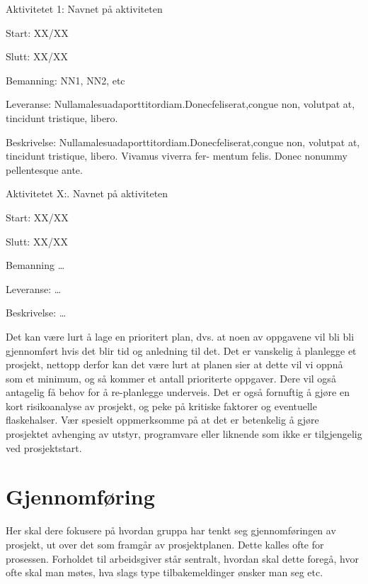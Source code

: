 \documentclass[11pt,a4paper]{report}
\begin{document}
\begin{compactdesc}
\item [Aktivitetet 1:] Navnet på aktiviteten
	\begin{compactitem}
	\item Start: XX/XX
	\item Slutt: XX/XX
	\item Bemanning: NN1, NN2, etc
	\item Leveranse: Nullamalesuadaporttitordiam.Donecfeliserat,congue
non, volutpat at, tincidunt tristique, libero. 
	\item Beskrivelse: Nullamalesuadaporttitordiam.Donecfeliserat,congue
non, volutpat at, tincidunt tristique, libero. Vivamus viverra fer- mentum felis. Donec nonummy pellentesque ante. 
	\end{compactitem}
	\item [Aktivitetet X:.] Navnet på aktiviteten
	\begin{compactitem}
	\item Start: XX/XX
	\item Slutt: XX/XX
	\item Bemanning \dots
	\item Leveranse: \dots
	\item Beskrivelse: \dots
	\end{compactitem}

\end{compactdesc}


Det kan være lurt å lage en prioritert plan, dvs. at noen av oppgavene vil bli bli gjennomført hvis det blir tid og anledning til det. Det er vanskelig å planlegge et prosjekt, nettopp derfor kan det være lurt at planen sier at dette vil vi oppnå som et minimum, og så kommer et antall prioriterte oppgaver. Dere vil også antagelig få behov for å re-planlegge underveis.  Det er også fornuftig å gjøre en kort risikoanalyse av prosjekt, og peke på kritiske faktorer og eventuelle flaskehalser. Vær spesielt oppmerksomme på at det er betenkelig å gjøre prosjektet avhenging av utstyr, programvare eller liknende som ikke er tilgjengelig ved prosjektstart.

\section*{Gjennomføring}

Her skal dere  fokusere på hvordan gruppa har tenkt seg gjennomføringen av prosjekt, ut over det som framgår av prosjektplanen. Dette kalles ofte for prosessen. Forholdet til arbeidsgiver står sentralt, hvordan skal dette foregå, hvor ofte skal man møtes, hva slags type tilbakemeldinger ønsker man seg etc.
\end{document}
